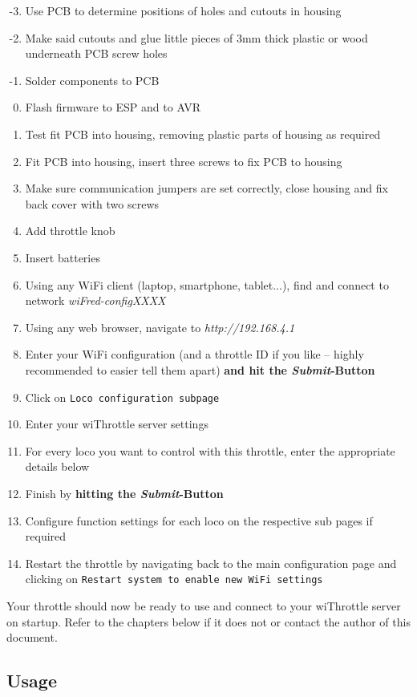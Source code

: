\documentclass[11pt,a4paper]{scrartcl}
\begin{document}
\begin{enumerate}
\setcounter{enumi}{-4}
\item Use PCB to determine positions of holes and cutouts in housing
\item Make said cutouts and glue little pieces of 3mm thick plastic or wood underneath PCB screw holes  
\item Solder components to PCB
\item Flash firmware to ESP and to AVR
\item Test fit PCB into housing, removing plastic parts of housing as required
\item Fit PCB into housing, insert three screws to fix PCB to housing
\item Make sure communication jumpers are set correctly, close housing and fix back cover with two screws
\item Add throttle knob
\item Insert batteries
\item Using any WiFi client (laptop, smartphone, tablet...), find and connect to network \textit{wiFred-configXXXX}
\item Using any web browser, navigate to \textit{http://192.168.4.1}
\item Enter your WiFi configuration (and a throttle ID if you like -- highly recommended to easier tell them apart) \textbf{and hit the \textit{Submit}-Button}
\item Click on \texttt{Loco configuration subpage}
\item Enter your wiThrottle server settings
\item For every loco you want to control with this throttle, enter the appropriate details below
\item Finish by \textbf{hitting the \textit{Submit}-Button}
\item Configure function settings for each loco on the respective sub pages if required
\item Restart the throttle by navigating back to the main configuration page and clicking on \texttt{Restart system to enable new WiFi settings}
\end{enumerate}

Your throttle should now be ready to use and connect to your wiThrottle server on startup. Refer to the chapters below if it does not or contact the author of this document.

\subsection{Usage}
\end{document}

